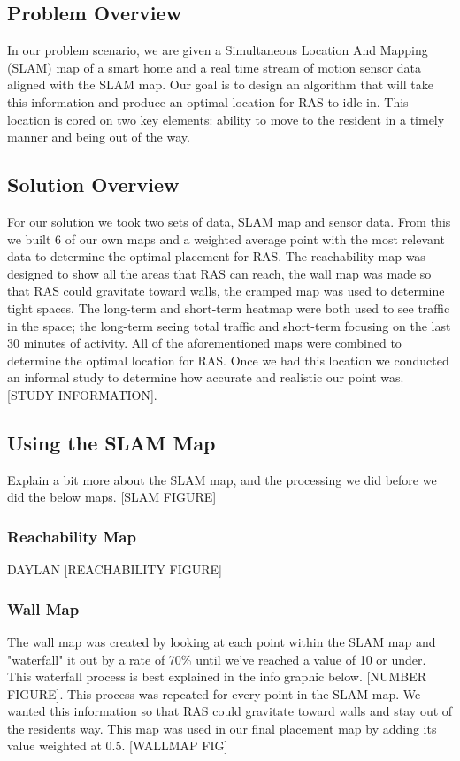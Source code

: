 \documentclass[11pt, draft, a4paper]{IEEEtran}
\begin{document}
\subsection{Problem Overview}
In our problem scenario, we are given a Simultaneous Location And Mapping (SLAM) map of a smart home and a real time stream of motion sensor data aligned with the SLAM map. Our goal is to design an algorithm that will take this information and produce an optimal location for RAS to idle in. This location is cored on two key elements: ability to move to the resident in a timely manner and being out of the way. 


\subsection{Solution Overview}
For our solution we took two sets of data, SLAM map and sensor data. From this we built 6 of our own maps and a weighted average point with the most relevant data to determine the optimal placement for RAS. The reachability map was designed to show all the areas that RAS can reach, the wall map was made so that RAS could gravitate toward walls, the cramped map was used to determine tight spaces. The long-term and short-term heatmap were both used to see traffic in the space; the long-term seeing total traffic and short-term focusing on the last 30 minutes of activity. All of the aforementioned maps were combined to determine the optimal location for RAS. Once we had this location we conducted an informal study to determine how accurate and realistic our point was. [STUDY INFORMATION].


\subsection{Using the SLAM Map}
Explain a bit more about the SLAM map, and the processing we did before we did the below maps.
[SLAM FIGURE]

\subsubsection{Reachability Map}
DAYLAN
[REACHABILITY FIGURE]


\subsubsection{Wall Map}
The wall map was created by looking at each point within the SLAM map and "waterfall" it out by a rate of 70\% until we've reached a value of 10 or under. This waterfall process is best explained in the info graphic below. [NUMBER FIGURE]. This process was repeated for every point in the SLAM map. We wanted this information so that RAS could gravitate toward walls and stay out of the residents way. This map was used in our final placement map by adding its value weighted at 0.5. [WALLMAP FIG]
\end{document}
